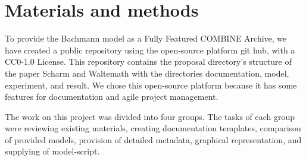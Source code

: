 \section*{Materials and methods}
To provide the Bachmann model as a Fully Featured COMBINE Archive, we have created a public repository using the open-source platform git hub, with a CC0-1.0 License. This repository contains the proposal directory's structure of the paper Scharm and Waltemath \cite{combine} with the directories documentation, model, experiment, and result. We chose this open-source platform because it has some features for documentation and agile project management.

The work on this project was divided into four groups. The tasks of each group were reviewing existing materials, creating documentation templates, comparison of provided models, provision of detailed metadata, graphical representation, and supplying of model-script.